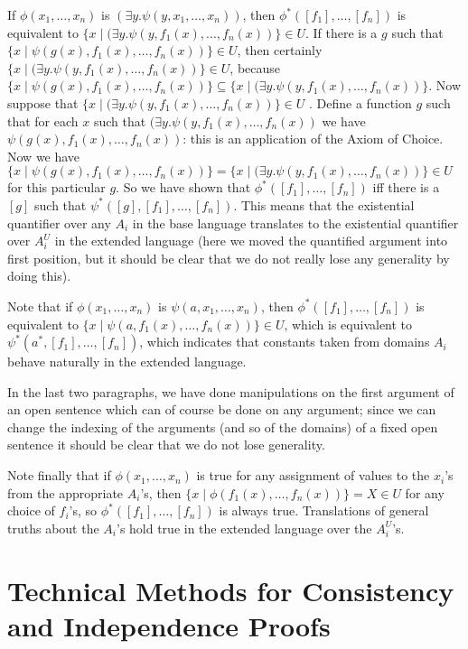 \documentclass[12pt]{book}
\begin{document}
\begin{description}
If $\phi(x_1,\ldots,x_n)$ is $(\exists y.\psi(y,x_1,\ldots,x_n))$, then $\phi^*([f_1],\ldots,[f_n])$ is equivalent to $\{x \mid (\exists y.\psi(y,f_1(x),\ldots,f_n(x))\} \in U$.  If there is a $g$ such that $\{x \mid \psi(g(x),f_1(x),\ldots,f_n(x))\} \in U$, then certainly $\{x \mid (\exists y.\psi(y,f_1(x),\ldots,f_n(x))\} \in U$, because $\{x \mid \psi(g(x),f_1(x),\ldots,f_n(x))\} \subseteq\{x \mid (\exists y.\psi(y,f_1(x),\ldots,f_n(x))\}$.
Now suppose that  $\{x \mid (\exists y.\psi(y,f_1(x),\ldots,f_n(x))\} \in U$ .  Define a function $g$ such that for each $x$ such that $(\exists y.\psi(y,f_1(x),\ldots,f_n(x))$ we have $\psi(g(x),f_1(x),\ldots,f_n(x))$:  this is an application of the Axiom of Choice.  Now we have $\{x \mid \psi(g(x),f_1(x),\ldots,f_n(x))\} = \{x \mid (\exists y.\psi(y,f_1(x),\ldots,f_n(x))\}\in U$ for this particular $g$.  So we have shown that $\phi^*([f_1],\ldots,[f_n])$ iff
there is a $[g]$ such that $\psi^*([g],[f_1],\ldots,[f_n])$.  This means that the existential quantifier over any $A_i$ in the base language translates to the existential quantifier over $A_i^U$ in the extended language (here we moved the quantified argument into first position, but it should be clear that we do not really lose any generality by doing this).

Note that if $\phi(x_1,\ldots,x_n)$ is $\psi(a,x_1,\ldots,x_n)$, then $\phi^*([f_1],\ldots,[f_n])$ is equivalent to $\{x \mid \psi(a,f_1(x),\ldots,f_n(x))\} \in U$, which is equivalent to $\psi^*(a^*,[f_1],\ldots,[f_n])$, which indicates that constants taken from domains $A_i$ behave naturally
in the extended language.

In the last two paragraphs, we have done manipulations on the first argument of an open sentence which can of course be done on any argument;
since we can change the indexing of the arguments (and so of the domains) of a fixed open sentence it should be clear that we do not lose generality.

Note finally that if $\phi(x_1,\ldots,x_n)$ is true for any assignment of values to the $x_i$'s from the appropriate $A_i$'s, then
$\{x \mid \phi(f_1(x),\ldots,f_n(x))\} = X \in U$ for any choice of $f_i$'s, so $\phi^*([f_1],\ldots,[f_n])$ is always true.  Translations of
general truths about the $A_i$'s hold true in the extended language over the $A_i^U$'s.


\end{description}

\section{Technical Methods for Consistency and Independence Proofs}
\end{document}
